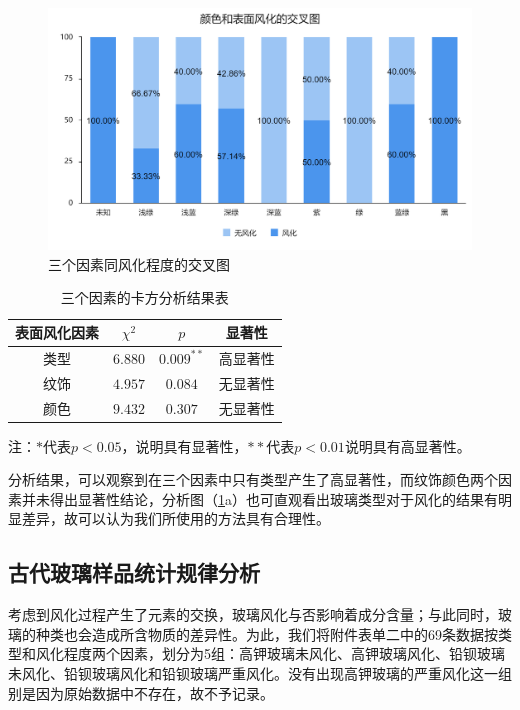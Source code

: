 \documentclass{my_paper}
\begin{document}
\begin{figure}[htbp]
{\begin{minipage}{0.4\textwidth}
      \includegraphics[width=\textwidth]{croys.png}%
      \end{minipage}
      }
      
  
      \caption{三个因素同风化程度的交叉图}    %
      \label{cro}    %
  \end{figure}

  \begin{table}[t]
  \centering
  \caption{三个因素的卡方分析结果表}
  \begin{tabular}{cccc}
  \toprule
  表面风化因素&$ \chi^2 $&$ p $&显著性\\\midrule
  类型&$ 6.880 $&$ 0.009^{**} $&高显著性\\
  纹饰&$ 4.957 $&$ 0.084 $&无显著性\\
  颜色&$ 9.432 $&$ 0.307 $&无显著性\\
  \bottomrule
    \end{tabular}

    \vspace{2pt}
    注：$*$代表$p<0.05$，说明具有显著性，$**$代表$p<0.01$说明具有高显著性。
  \label{chi}
    \end{table}
    分析结果，可以观察到在三个因素中只有类型产生了高显著性，而纹饰颜色两个因素并未得出显著性结论，分析图（\ref{cro}a）也可直观看出玻璃类型对于风化的结果有明显差异，故可以认为我们所使用的方法具有合理性。

    \subsection{古代玻璃样品统计规律分析}
    考虑到风化过程产生了元素的交换，玻璃风化与否影响着成分含量；与此同时，玻璃的种类也会造成所含物质的差异性。为此，我们将附件表单二中的69条数据按类型和风化程度两个因素，划分为5组：高钾玻璃未风化、高钾玻璃风化、铅钡玻璃未风化、铅钡玻璃风化和铅钡玻璃严重风化。没有出现高钾玻璃的严重风化这一组别是因为原始数据中不存在，故不予记录。
    
\end{document}
